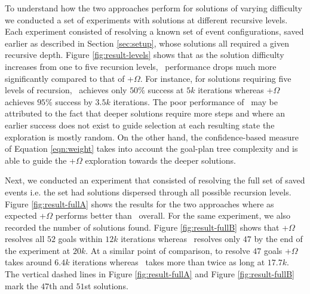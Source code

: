 \begin{figure*}[t]
\begin{center}
\subfigure[\CL]{\label{fig:result-levelsA}

}
\qquad
\subfigure[\CL+$\Omega$]{\label{fig:result-levelsB}

}
\caption{Agent performance under \CL\ and \CL+$\Omega$ schemes for solutions at recursion levels one (pluses), three (circles) and five (crosses). Each point represents results from $5$ experiment runs using an averaging window of $100$ samples.}
\label{fig:result-levels}
\end{center}
\end{figure*}

To understand how the two approaches perform for solutions of varying difficulty we conducted a set of experiments with solutions at different recursive levels. Each experiment consisted of resolving a known set of  event configurations, saved earlier as described in Section \ref{sec:setup}, whose solutions all required a given recursive depth. Figure \ref{fig:result-levels} shows that as the solution difficulty increases from one to five recursion levels, \CL\ performance drops much more significantly compared to that of \CL+$\Omega$. For instance, for solutions requiring five levels of recursion, \CL\ achieves only $50\%$ success at $5k$ iterations whereas \CL+$\Omega$ achieves $95\%$ success by $3.5k$ iterations. The poor performance of \CL\ may be attributed to the fact that deeper solutions require more  steps and where an earlier success does not exist to guide selection at each resulting state the exploration is mostly random. On the other hand, the confidence-based measure of Equation \ref{eqn:weight} takes into account the goal-plan tree complexity and is able to guide the \CL+$\Omega$ exploration towards the deeper solutions.

Next, we conducted an experiment that consisted of resolving the full set of saved  events i.e. the set had solutions dispersed through all possible recursion levels. Figure \ref{fig:result-fullA} shows the results for the two approaches where as expected \CL+$\Omega$ performs better than \CL\ overall. For the same experiment, we also recorded the number of solutions found. Figure \ref{fig:result-fullB} shows that \CL+$\Omega$ resolves all $52$ goals within $12k$ iterations whereas \CL\ resolves only $47$ by the end of the experiment at $20k$. At a similar point of comparison, to resolve $47$ goals \CL+$\Omega$ takes around $6.4k$ iterations whereas \CL\ takes more than twice as long at $17.7k$. The vertical dashed lines in Figure \ref{fig:result-fullA} and Figure \ref{fig:result-fullB} mark the $47$th and $51$st solutions.

